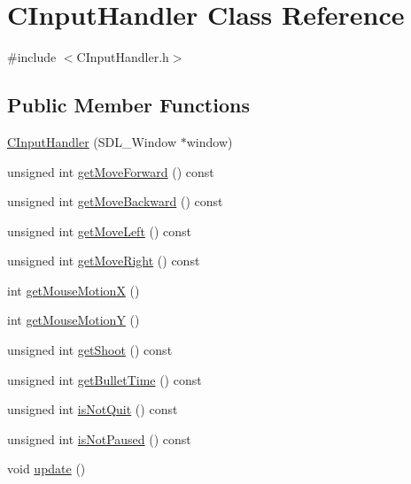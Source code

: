 \hypertarget{class_c_input_handler}{}\section{C\+Input\+Handler Class Reference}
\label{class_c_input_handler}


{\ttfamily \#include $<$C\+Input\+Handler.\+h$>$}

\subsection*{Public Member Functions}
\begin{DoxyCompactItemize}
\item 
\hyperlink{class_c_input_handler_ad10a09776182b19f8d2fb8c94783f62b}{C\+Input\+Handler} (S\+D\+L\+\_\+\+Window $\ast$window)
\item 
unsigned int \hyperlink{class_c_input_handler_ac88f100550f23d224643ffc1801a7a27}{get\+Move\+Forward} () const 
\item 
unsigned int \hyperlink{class_c_input_handler_aecae50d5dd512a6cf7b56d45e7c48fe8}{get\+Move\+Backward} () const 
\item 
unsigned int \hyperlink{class_c_input_handler_abfbaa0df671e0987a5c98ed83dd84772}{get\+Move\+Left} () const 
\item 
unsigned int \hyperlink{class_c_input_handler_ac0ebb8587bab52b81784709c53af7b6a}{get\+Move\+Right} () const 
\item 
int \hyperlink{class_c_input_handler_ab7bc29cbd6e56bdf18698a343e821fd6}{get\+Mouse\+MotionX} ()
\item 
int \hyperlink{class_c_input_handler_a0f591f7199ae9a81b4e86138e8b39839}{get\+Mouse\+MotionY} ()
\item 
unsigned int \hyperlink{class_c_input_handler_aab425f9f242399cd9798900920a85b20}{get\+Shoot} () const 
\item 
unsigned int \hyperlink{class_c_input_handler_ab8c88284fba4d8aeab1ca79069e0c966}{get\+Bullet\+Time} () const 
\item 
unsigned int \hyperlink{class_c_input_handler_a3ef0877d1ebc6af27b9714308263733f}{is\+Not\+Quit} () const 
\item 
unsigned int \hyperlink{class_c_input_handler_a19cdfa54754b2c73a59a72c29d1dfe7e}{is\+Not\+Paused} () const 
\item 
void \hyperlink{class_c_input_handler_acb61cb9aca6ccd5f7a8af1ca890dfc6c}{update} ()
\end{DoxyCompactItemize}


